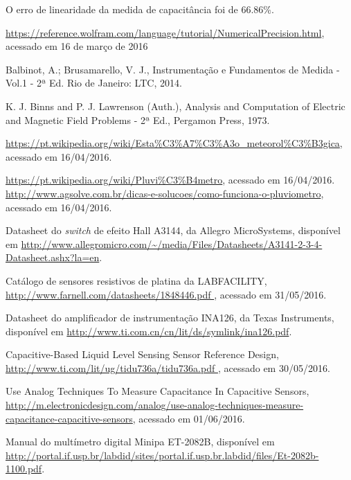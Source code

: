 \documentclass[a4paper]{instrumentacao}
\begin{document}
O erro de linearidade da medida de capacitância foi de 66.86\%.

\newpage
\begin{thebibliography}{9}
 \url{https://reference.wolfram.com/language/tutorial/NumericalPrecision.html}, acessado em 16 de março de 2016

  Balbinot, A.; Brusamarello, V. J., Instrumentação e Fundamentos de Medida - Vol.1 - 2ª Ed. Rio de Janeiro: LTC, 2014.

 K. J. Binns and P. J. Lawrenson (Auth.), Analysis and Computation of Electric and Magnetic Field Problems - 2ª Ed., Pergamon Press, 1973.

 \url{https://pt.wikipedia.org/wiki/Esta\%C3\%A7\%C3\%A3o_meteorol\%C3\%B3gica}, acessado em 16/04/2016.

 \url{https://pt.wikipedia.org/wiki/Pluvi\%C3\%B4metro}, acessado em 16/04/2016.
 \url{http://www.agsolve.com.br/dicas-e-solucoes/como-funciona-o-pluviometro}, acessado em 16/04/2016.

 Datasheet do \textit{switch} de efeito Hall A3144, da Allegro MicroSystems, disponível em \url{http://www.allegromicro.com/~/media/Files/Datasheets/A3141-2-3-4-Datasheet.ashx?la=en}.

 Catálogo de sensores resistivos de platina da LABFACILITY, \url{http://www.farnell.com/datasheets/1848446.pdf }, acessado em 31/05/2016.

 Datasheet do amplificador de instrumentação INA126, da Texas Instruments, disponível em \url{http://www.ti.com.cn/cn/lit/ds/symlink/ina126.pdf}.

 Capacitive-Based Liquid Level Sensing Sensor Reference Design, \url{http://www.ti.com/lit/ug/tidu736a/tidu736a.pdf
}, acessado em 30/05/2016.

 Use Analog Techniques To Measure Capacitance In Capacitive Sensors, \url{http://m.electronicdesign.com/analog/use-analog-techniques-measure-capacitance-capacitive-sensors}, acessado em 01/06/2016.

 Manual do multímetro digital Minipa ET-2082B, disponível em \url{http://portal.if.usp.br/labdid/sites/portal.if.usp.br.labdid/files/Et-2082b-1100.pdf}.



\end{thebibliography}
\end{document}
